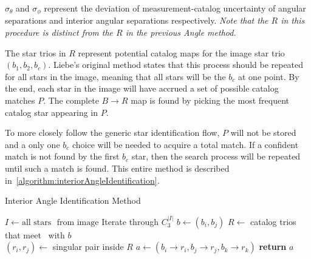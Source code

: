 $\sigma_{\theta}$ and $\sigma_{\phi}$ represent the deviation of measurement-catalog uncertainty of angular separations
and interior angular separations respectively.
\textit{Note that the $R$ in this procedure is distinct from the $R$ in the previous Angle method.}

The star trios in $R$ represent potential catalog maps for the image star trio $(b_1, b_2, b_c)$.
Liebe's original method states that this process should be repeated for all stars in the image, meaning that all
stars will be the $b_c$ at one point.
By the end, each star in the image will have accrued a set of possible catalog matches $P$.
The complete $B \rightarrow R$ map is found by picking the most frequent catalog star appearing in $P$.

To more closely follow the generic star identification flow, $P$ will not be stored and a only one $b_c$ choice will be
needed to acquire a total match.
If a confident match is not found by the first $b_c$ star, then the search process will be repeated until such a
match is found.
This entire method is described in~\autoref{algorithm:interiorAngleIdentification}.

\begin{algorithm}
    \caption{Interior Angle Identification Method} \label{algorithm:interiorAngleIdentification}
    \begin{algorithmic}[1]
        \State $I \gets \text{all stars } \text{ from image}$
          \Comment Iterate through $C^{|I|}_3$
        \State $b \gets (b_i, b_j)$
        \State $R \gets $ catalog trios that meet~ with $b$
        \\
        \State $(r_i, r_j) \gets $ singular pair inside $R$
        \State $a \gets (b_i \rightarrow r_i, b_j \rightarrow r_j, b_k \rightarrow r_k)$
        \State \textbf{return} $a$
        \EndIf
        \EndFor
        \EndFor
        \EndFor
        \EndProcedure
    \end{algorithmic}
\end{algorithm}

